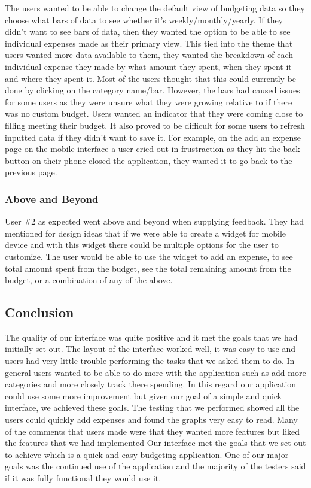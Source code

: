 \documentclass{chi2011}
\begin{document}
	The users wanted to be able to change the default view of budgeting data so they choose
	what bars of data to see whether it's weekly/monthly/yearly. If they didn't want to see bars of
	data, then they wanted the option to be able to see individual expenses made as their primary 
	view. This tied into the theme that users wanted more data available to them, they wanted the
	breakdown of each individual expense they made by what amount they spent, when they spent it 
	and where they spent it. Most of the users thought that this could currently be done by 
	clicking on the category name/bar. However, the bars had caused issues for some users as they 
	were unsure what they were growing relative to if there was no custom budget. Users wanted an 
	indicator that they were coming close to filling meeting their budget. It also proved to be 
	difficult for some users to refresh inputted data if they didn't want to save it. For example,
	on the add an expense page on the mobile interface a user cried out in frustraction as they hit
	the back button on their phone closed the application, they wanted it to go back to the 
	previous page. 

	\subsubsection{Above and Beyond}
	
	User \#2 as expected went above and beyond when supplying feedback. They had mentioned for 
	design ideas that if we were able to create a widget for mobile device and with this widget
	there could be multiple options for the user to customize. The user would be able to use the 
	widget to add an expense, to see total amount spent from the budget, see the total remaining 
	amount from the budget, or a combination of any of the above. 

	\subsection{Conclusion}
	The quality of our interface was quite positive and it met the goals that we
	had initially set out. The layout of the interface worked well, it was easy
	to use and users had very little trouble performing the tasks that we asked
	them to do. In general users wanted to be able to do more with the
	application such as add more categories and more closely track there
	spending. In this regard our application could use some more improvement but
	given our goal of a simple and quick interface, we achieved these goals. The
	testing that we performed showed all the users could quickly add expenses
	and found the graphs very easy to read. Many of the comments that users made
	were that they wanted more features but liked the features that we had
	implemented Our interface met the goals that we set out to achieve which is
	a quick and easy budgeting application. One of our major goals was the
	continued use of the application and the majority of the testers said if it
	was fully functional they would use it.
\end{document}
